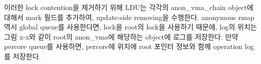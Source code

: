 \fi


\ifkor
이러한 lock contention을 제거하기 위해 LDU는 각각의 anon\_vma\_chain object에 대해서
mark 필드를 추가하여, update-side removing을 수행한다.
anonymous rmap역시 global queue를 사용한다면, lock을 root의 lock을 사용하기 때문에, log의 위치는 그림
x-x와 같이 root의 anon\_vma에 해당하는 object에 로그를 저장한다. 
만약 percore queue를 사용하면, percore에 위치에 root 포인터 정보와 함께 operation log를 저장한다.
\else


\fi







 

